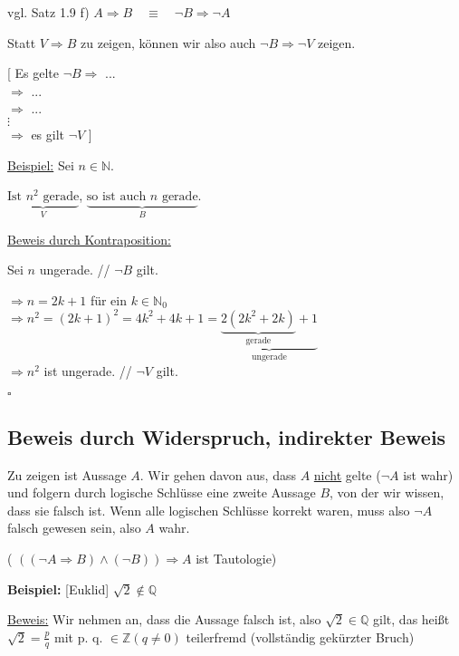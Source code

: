 \documentclass[a4paper, 12pt, twoside] {article}
\begin{document}
vgl. Satz 1.9 f) \qquad $A \Rightarrow B \quad \equiv \quad \neg B \Rightarrow \neg A$

Statt $V \Rightarrow B$ zu zeigen, können wir also auch $\neg B \Rightarrow \neg V$ zeigen.


[ Es gelte $\neg B \Rightarrow$ ... \\
\text{\qquad\qquad\qquad} $\Rightarrow$ ... \\
\text{\qquad\qquad\qquad} $\Rightarrow$ ... \\
\text{\qquad\qquad\qquad} \space $\vdots$ \\
\text{\qquad\qquad\qquad} $\Rightarrow$ es gilt $\neg V$ ]

\hfill

\underline{Beispiel:} Sei $n \in \mathbb{N}$.

$\underbrace{\text{Ist $n^2$ gerade}}_{V}$, $\underbrace{\text{so ist auch $n$ gerade}}_{B}$.

\hfill

\underline{Beweis durch Kontraposition:}

Sei $n$ ungerade. \hfill // $\neg B$ gilt.

$\Rightarrow n = 2k + 1$ für ein $k \in \mathbb{N}_0$ \\
$\Rightarrow n^2 = (2k+1)^2 = 4k^2+4k+1 = \underbrace{\underbrace{2(2k^2+2k)}_{\text{gerade}}+1}_{\text{ungerade}}$ \\
$\Rightarrow n^2$ ist ungerade. \hfill // $\neg V$ gilt.

\hfill $\square$

\subsection{Beweis durch Widerspruch, indirekter Beweis}

Zu zeigen ist Aussage $A$. Wir gehen davon aus, dass $A$ \underline{nicht} gelte ($\neg A$ ist wahr) und folgern durch logische Schlüsse eine zweite Aussage $B$, von der wir wissen, dass sie falsch ist. Wenn alle logischen Schlüsse korrekt waren, muss also $\neg A$ falsch gewesen sein, also $A$ wahr.

( $((\neg A \Rightarrow B) \land (\neg B)) \Rightarrow A$ ist Tautologie)


\textbf{Beispiel:} [Euklid] $\sqrt{2} \notin \mathbb{Q}$

\underline{Beweis:} Wir nehmen an, dass die Aussage falsch ist, also $\sqrt{2} \in \mathbb{Q}$ gilt,
das heißt $\sqrt{2} = \frac{p}{q}$ mit p. q. $\in \mathbb{Z} (q \neq 0)$ teilerfremd (vollständig gekürzter Bruch)
\end{document}
